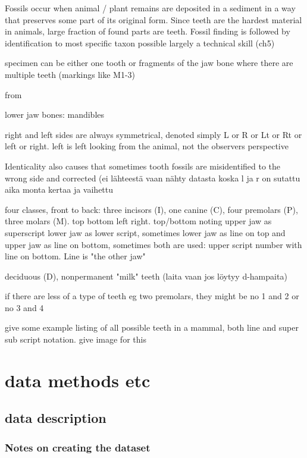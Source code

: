 \documentclass{article}
\begin{document}
Fossils occur when animal / plant remains are deposited in a sediment in a way that preserves 
some part of its original form. Since teeth are the hardest material in animals, large fraction
of found parts are teeth. Fossil finding is followed by identification to most specific taxon possible
largely a technical skill (ch5)

specimen can be either one tooth or fragments of the jaw bone where there are multiple teeth (markings like M1-3)

from \cite{Hillson_2005}

lower jaw bones: mandibles

right and left sides are always symmetrical, denoted simply L or R or Lt or Rt or left or right. left is left looking from the animal, not the observers perspective

Identicality also causes that sometimes tooth fossils are misidentified to the wrong side and corrected (ei lähteestä vaan nähty datasta koska l ja r on sutattu aika monta kertaa ja vaihettu

four classes, front to back: three incisors (I), one canine (C), four premolars (P), three molars (M). top bottom left right. top/bottom noting upper jaw as superscript lower jaw as lower script, 
sometimes lower jaw as line on top and upper jaw as line on bottom, sometimes both are used: upper script number with line on bottom. Line is "the other jaw"

deciduous (D), nonpermanent "milk" teeth (laita vaan jos löytyy d-hampaita)

if there are less of a type of teeth eg two premolars, they might be no 1 and 2 or no 3 and 4

give some example listing of all possible teeth in a mammal, both line and 
super sub script notation. give image for this

\section{data methods etc}

\subsection{data description}

\subsubsection{Notes on creating the dataset}
\end{document}
